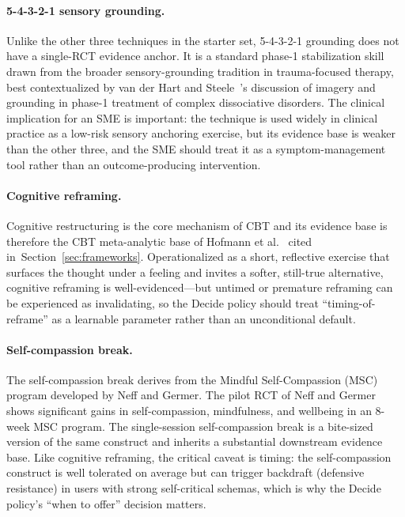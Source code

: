 \documentclass[11pt,a4paper]{article}
\newcommand{\secref}[1]{Section~\ref{#1}}
\begin{document}
\paragraph{5-4-3-2-1 sensory grounding.} Unlike the other three
techniques in the starter set, 5-4-3-2-1 grounding does not have
a single-RCT evidence anchor. It is a standard phase-1
stabilization skill drawn from the broader sensory-grounding
tradition in trauma-focused therapy, best contextualized by van
der Hart and Steele~\cite{vanderHart2012Imagery}'s discussion of
imagery and grounding in phase-1 treatment of complex dissociative
disorders. The clinical implication for an SME is important: the
technique is used widely in clinical practice as a low-risk
sensory anchoring exercise, but its evidence base is weaker than
the other three, and the SME should treat it as a
symptom-management tool rather than an outcome-producing
intervention.

\paragraph{Cognitive reframing.} Cognitive restructuring is the
core mechanism of CBT and its evidence base is therefore the CBT
meta-analytic base of Hofmann et al.~\cite{Hofmann2012CBTMeta}
cited in~\secref{sec:frameworks}. Operationalized as a short,
reflective exercise that surfaces the thought under a feeling and
invites a softer, still-true alternative, cognitive reframing is
well-evidenced---but untimed or premature reframing can be
experienced as invalidating, so the Decide policy should treat
``timing-of-reframe'' as a learnable parameter rather than an
unconditional default.

\paragraph{Self-compassion break.}
The self-compassion break derives from the Mindful Self-Compassion
(MSC) program developed by Neff and Germer. The pilot RCT of Neff
and Germer~\cite{NeffGermer2013MSC} shows significant gains in
self-compassion, mindfulness, and wellbeing in an 8-week MSC
program. The single-session self-compassion break is a bite-sized
version of the same construct and inherits a substantial
downstream evidence base. Like cognitive reframing, the
critical caveat is timing: the self-compassion construct is well
tolerated on average but can trigger backdraft (defensive
resistance) in users with strong self-critical schemas, which is
why the Decide policy's ``when to offer'' decision matters.
\end{document}
